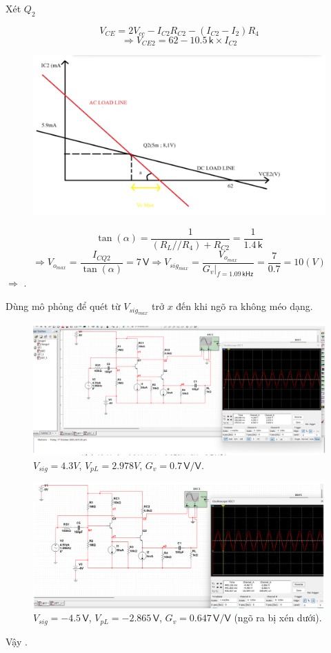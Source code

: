 Xét $Q_{2}$

\[ V_{CE} = 2V_{cc} - I_{C2} R_{C2} - (I_{C2} - I_{2})R_{4}\]
\[\Rightarrow V_{CE2} = 62 - 10.5\,\textsf{k}\times I_{C2}\]

\begin{figure}[H]
	\centering
	\includegraphics[width=.8\linewidth]{./my-chapters/my-images/Question7/c_hinh1.png}
\end{figure}

\[ \tan(\alpha) = \dfrac{1}{(R_{L}//R_{4}) + R_{C2}} = \dfrac{1}{1.4\,\textsf{k}}\]
\[\Rightarrow V_{o_{max}} = \dfrac{I_{CQ2}}{\tan(\alpha)} = 7 \,\textsf{V} \Rightarrow V_{sig_{max}} = \dfrac{V_{o_{max}}}{G_{v}\bigg|_{f = 1.09\,\textsf{kHz}}} = \dfrac{7}{0.7} = 10 (V)\]
$\Rightarrow$ .

Dùng mô phỏng để quét từ $V_{sig_{max}}$ trở $x$ đến khi ngõ ra không méo dạng.

\begin{figure}[H]
	\centering
	\includegraphics[width=.8\linewidth]{./my-chapters/my-images/Question7/c_hinh2.png}
	\caption{$V_{sig} = 4.3V$, $V_{pL} = 2.978V$, $G_{v} = 0.7\,\textsf{V/V}$.}
\end{figure}

\begin{figure}[H]
	\centering
	\includegraphics[width=.8\linewidth]{./my-chapters/my-images/Question7/c_hinh3.png}
	\caption{$V_{sig} = -4.5\,\textsf{V}$, $V_{pL} = -2.865\,\textsf{V}$, $G_{v} = 0.647\,\textsf{V/V}$ (ngõ ra bị xén dưới).}
\end{figure}

Vậy . 

